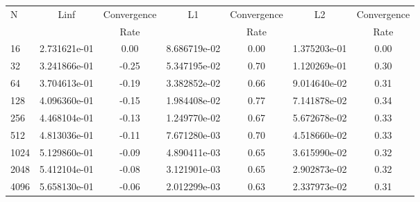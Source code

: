 \documentclass[12pt]{article}
\begin{document}
	\begin{tabular}{l|c|c|c|c|c|c}
		N&Linf&Convergence&L1&Convergence&L2&Convergence\\
		&&Rate&&Rate&&Rate\\
		\hline
		16&2.731621e-01&0.00&8.686719e-02&0.00&1.375203e-01&0.00\\
		\hline
		32&3.241866e-01&-0.25&5.347195e-02&0.70&1.120269e-01&0.30\\
		\hline
		64&3.704613e-01&-0.19&3.382852e-02&0.66&9.014640e-02&0.31\\
		\hline
		128&4.096360e-01&-0.15&1.984408e-02&0.77&7.141878e-02&0.34\\
		\hline
		256&4.468104e-01&-0.13&1.249770e-02&0.67&5.672678e-02&0.33\\
		\hline
		512&4.813036e-01&-0.11&7.671280e-03&0.70&4.518660e-02&0.33\\
		\hline
		1024&5.129860e-01&-0.09&4.890411e-03&0.65&3.615990e-02&0.32\\
		\hline
		2048&5.412104e-01&-0.08&3.121901e-03&0.65&2.902873e-02&0.32\\
		\hline
		4096&5.658130e-01&-0.06&2.012299e-03&0.63&2.337973e-02&0.31\\
	\end{tabular}
\end{document}
